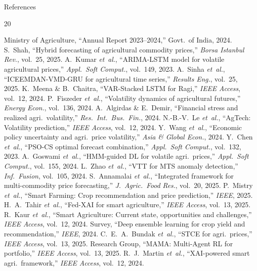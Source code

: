 \documentclass{beamer}
\begin{document}
\begin{frame}[label=refs]{References}
\tiny
\begin{thebibliography}{20}

 Ministry of Agriculture, ``Annual Report 2023--2024,'' Govt.\ of India, 2024.
 S.~Shah, ``Hybrid forecasting of agricultural commodity prices,'' \textit{Borsa Istanbul Rev.}, vol.~25, 2025.
 A.~Kumar \textit{et~al.}, ``ARIMA-LSTM model for volatile agricultural prices,'' \textit{Appl.\ Soft Comput.}, vol.~149, 2023.
 A.~Sinha \textit{et~al.}, ``ICEEMDAN-VMD-GRU for agricultural time series,'' \textit{Results Eng.}, vol.~25, 2025.
 K.~Meena \& B.~Chaitra, ``VAR-Stacked LSTM for Ragi,'' \textit{IEEE Access}, vol.~12, 2024.
 P.~Fiszeder \textit{et~al.}, ``Volatility dynamics of agricultural futures,'' \textit{Energy Econ.}, vol.~136, 2024.
 A.~Algirdas \& E.~Demir, ``Financial stress and realized agri.\ volatility,'' \textit{Res.\ Int.\ Bus.\ Fin.}, 2024.
 N.-B.-V.~Le \textit{et~al.}, ``AgTech: Volatility prediction,'' \textit{IEEE Access}, vol.~12, 2024.
 Y.~Wang \textit{et~al.}, ``Economic policy uncertainty and agri.\ price volatility,'' \textit{Asia \& Global Econ.}, 2024.
 Y.~Chen \textit{et~al.}, ``PSO-CS optimal forecast combination,'' \textit{Appl.\ Soft Comput.}, vol.~132, 2023.
 A.~Goswami \textit{et~al.}, ``HMM-guided DL for volatile agri.\ prices,'' \textit{Appl.\ Soft Comput.}, vol.~155, 2024.
 L.~Zhao \textit{et~al.}, ``VTT for MTS anomaly detection,'' \textit{Inf.\ Fusion}, vol.~105, 2024.
 S.~Annamalai \textit{et~al.}, ``Integrated framework for multi-commodity price forecasting,'' \textit{J.\ Agric.\ Food Res.}, vol.~20, 2025.
 P.~Mistry \textit{et~al.}, ``Smart Farming: Crop recommendation and price prediction,'' \textit{IEEE}, 2025.
 H.~A.~Tahir \textit{et~al.}, ``Fed-XAI for smart agriculture,'' \textit{IEEE Access}, vol.~13, 2025.
 R.~Kaur \textit{et~al.}, ``Smart Agriculture: Current state, opportunities and challenges,'' \textit{IEEE Access}, vol.~12, 2024.
 Survey, ``Deep ensemble learning for crop yield and recommendation,'' \textit{IEEE}, 2024.
 C.~E.~A.~Bundak \textit{et~al.}, ``STCE for agri.\ prices,'' \textit{IEEE Access}, vol.~13, 2025.
 Research Group, ``MAMA: Multi-Agent RL for portfolio,'' \textit{IEEE Access}, vol.~13, 2025.
 R.~J.~Martin \textit{et~al.}, ``XAI-powered smart agri.\ framework,'' \textit{IEEE Access}, vol.~12, 2024.

\end{thebibliography}

\end{frame}
\end{document}
